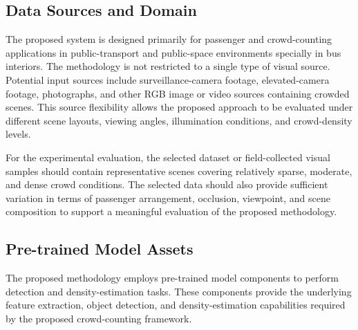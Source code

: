\documentclass[12pt,a4paper]{report}
\begin{document}
\subsection{Data Sources and Domain}

The proposed system is designed primarily for passenger and crowd-counting applications in public-transport and public-space environments specially in bus interiors. The methodology is not restricted to a single type of visual source.
Potential input sources include surveillance-camera footage, elevated-camera
footage, photographs, and other RGB image or video sources containing
crowded scenes. This source flexibility allows the proposed approach to be
evaluated under different scene layouts, viewing angles, illumination
conditions, and crowd-density levels.

For the experimental evaluation, the selected dataset or field-collected
visual samples should contain representative scenes covering relatively
sparse, moderate, and dense crowd conditions. The selected data should also
provide sufficient variation in terms of passenger arrangement, occlusion,
viewpoint, and scene composition to support a meaningful evaluation of the
proposed methodology.

\subsection{Pre-trained Model Assets}

The proposed methodology employs pre-trained model components to perform
detection and density-estimation tasks. These components provide the
underlying feature extraction, object detection, and density-estimation
capabilities required by the proposed crowd-counting framework.
\end{document}
